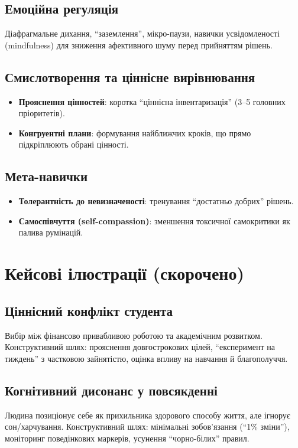 \documentclass[12pt,a4paper]{article}
\begin{document}
\subsection{Емоційна регуляція}
Діафрагмальне дихання, \enquote{заземлення}, мікро-паузи, навички усвідомленості (mindfulness) для зниження афективного шуму перед прийняттям рішень.

\subsection{Смислотворення та ціннісне вирівнювання}
\begin{itemize}[left=6mm]
    \item \textbf{Прояснення цінностей}: коротка \enquote{ціннісна інвентаризація} (3–5 головних пріоритетів).
    \item \textbf{Конгруентні плани}: формування найближчих кроків, що прямо підкріплюють обрані цінності.
\end{itemize}

\subsection{Мета-навички}
\begin{itemize}[left=6mm]
    \item \textbf{Толерантність до невизначеності}: тренування \enquote{достатньо добрих} рішень.
    \item \textbf{Самоспівчуття (self-compassion)}: зменшення токсичної самокритики як палива румінацій.
\end{itemize}

\section{Кейсові ілюстрації (скорочено)}
\subsection{Ціннісний конфлікт студента}
Вибір між фінансово привабливою роботою та академічним розвитком. Конструктивний шлях: прояснення довгострокових цілей, \enquote{експеримент на тиждень} з частковою зайнятістю, оцінка впливу на навчання й благополуччя.

\subsection{Когнітивний дисонанс у повсякденні}
Людина позиціонує себе як прихильника здорового способу життя, але ігнорує сон/харчування. Конструктивний шлях: мінімальні зобов'язання (\enquote{1\% зміни}), моніторинг поведінкових маркерів, усунення \enquote{чорно-білих} правил.
\end{document}
